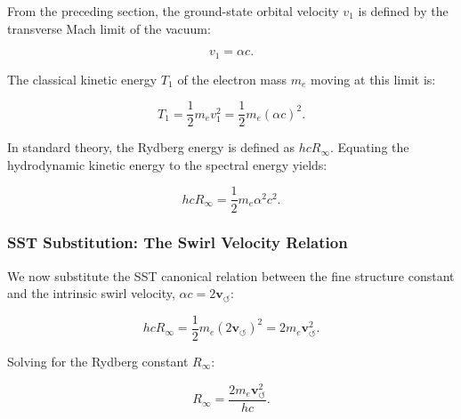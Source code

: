         From the preceding section, the ground-state orbital velocity $v_1$ is
        defined by the transverse Mach limit of the vacuum:

        \begin{equation}
            v_1 = \alpha c.
            \label{eq:v1_mach}
        \end{equation}

        The classical kinetic energy $T_1$ of the electron mass $m_e$ moving
        at this limit is:

        \begin{equation}
            T_1 = \frac{1}{2} m_e v_1^2 = \frac{1}{2} m_e (\alpha c)^2.
        \end{equation}

        In standard theory, the Rydberg energy is defined as $hcR_\infty$.
        Equating the hydrodynamic kinetic energy to the spectral energy yields:

        \begin{equation}
            hcR_\infty = \frac{1}{2} m_e \alpha^2 c^2.
        \end{equation}

    \subsubsection*{SST Substitution: The Swirl Velocity Relation}

        We now substitute the SST canonical relation between the fine structure
        constant and the intrinsic swirl velocity, $\alpha c = 2 \mathbf{v}_{\!\boldsymbol{\circlearrowleft}}$:

        \begin{equation}
            hcR_\infty = \frac{1}{2} m_e (2 \mathbf{v}_{\!\boldsymbol{\circlearrowleft}})^2
            = 2 m_e \mathbf{v}_{\!\boldsymbol{\circlearrowleft}}^2.
        \end{equation}

        Solving for the Rydberg constant $R_\infty$:

        \begin{equation}
            R_\infty = \frac{2 m_e \mathbf{v}_{\!\boldsymbol{\circlearrowleft}}^2}{hc}.
            \label{eq:SST_Rydberg}
        \end{equation}

